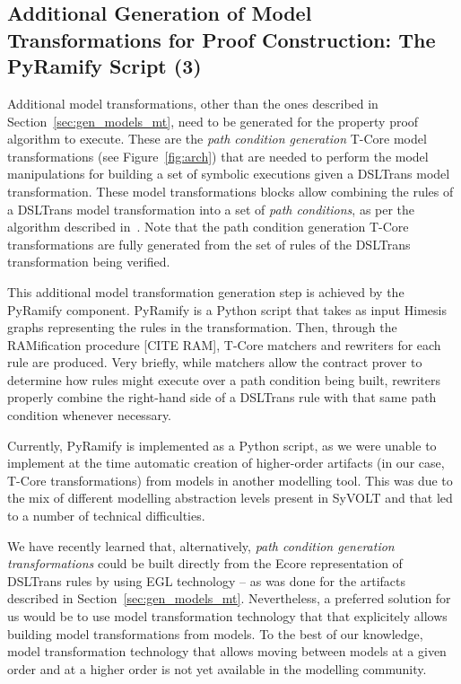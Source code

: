 

\subsection{Additional Generation of Model Transformations for Proof
Construction: The PyRamify Script (3)}

Additional model transformations, other than the ones described in
Section~\ref{sec:gen_models_mt}, need to be generated for the property proof
algorithm to execute. These are the \emph{path condition generation} T-Core
model transformations (see Figure~\ref{fig:arch}) that are needed to perform the
model manipulations for building a set of symbolic executions given a DSLTrans
model transformation. These model transformations blocks allow combining the rules of a DSLTrans model
transformation into a set of \emph{path conditions}, as per the algorithm
described in~\cite{Lucio2014}. Note that the path condition generation T-Core
transformations are fully generated from the set of rules of the DSLTrans
transformation being verified.

This additional model transformation generation step is achieved by the PyRamify
component. PyRamify is a Python script that takes as input Himesis graphs
representing the rules in the transformation. Then, through the RAMification
procedure [CITE RAM], T-Core matchers and rewriters for each rule are produced.
Very briefly, while matchers allow the contract prover to determine how
rules might execute over a path condition being built, rewriters properly
combine the right-hand side of a DSLTrans rule with that same path condition
whenever necessary.


Currently, PyRamify is implemented as a Python script, as we were unable to
implement at the time automatic creation of higher-order artifacts (in our
case, T-Core transformations) from models in another modelling tool.
This was due to the mix of different modelling abstraction levels present in
SyVOLT and that led to a number of technical difficulties.

We have recently learned that, alternatively, \emph{path condition generation
transformations} could be built directly from the Ecore representation of
DSLTrans rules by using EGL technology -- as was done for the artifacts
described in Section~\ref{sec:gen_models_mt}. Nevertheless, a preferred solution for us would
be to use model transformation technology that that explicitely allows
building model transformations from models. To the best of our knowledge,
model transformation technology that allows moving between models at a given
order and at a higher order is not yet available in the modelling community.

